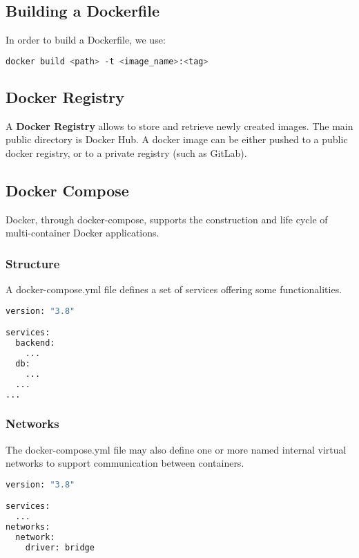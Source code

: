 \documentclass{article}
\begin{document}
\subsection{Building a Dockerfile}
In order to build a Dockerfile, we use: \\
	
\begin{lstlisting}[language=bash,breaklines=true,label={code:compose}]
docker build <path> -t <image_name>:<tag>
\end{lstlisting}

\subsection{Docker Registry}
A \textbf{Docker Registry} allows to store and retrieve newly created images. The main public directory is Docker Hub. A docker image can be either pushed to a public docker registry, or to a private registry (such as GitLab).

\subsection{Docker Compose}
Docker, through docker-compose, supports the construction and life cycle of multi-container Docker applications.

\subsubsection{Structure}
A docker-compose.yml file defines a set of services offering some functionalities. \\

\begin{lstlisting}[language=bash,breaklines=true,label={code:compose}]
version: "3.8"

services:
  backend:
    ...
  db:
    ...
  ...
...
\end{lstlisting}

\subsubsection{Networks}
The docker-compose.yml file may also define one or more named internal virtual networks to support communication between containers. \\

\begin{lstlisting}[language=bash,breaklines=true,label={code:compose}]
version: "3.8"

services:
  ...
networks:
  network:
    driver: bridge
\end{lstlisting}
\end{document}
